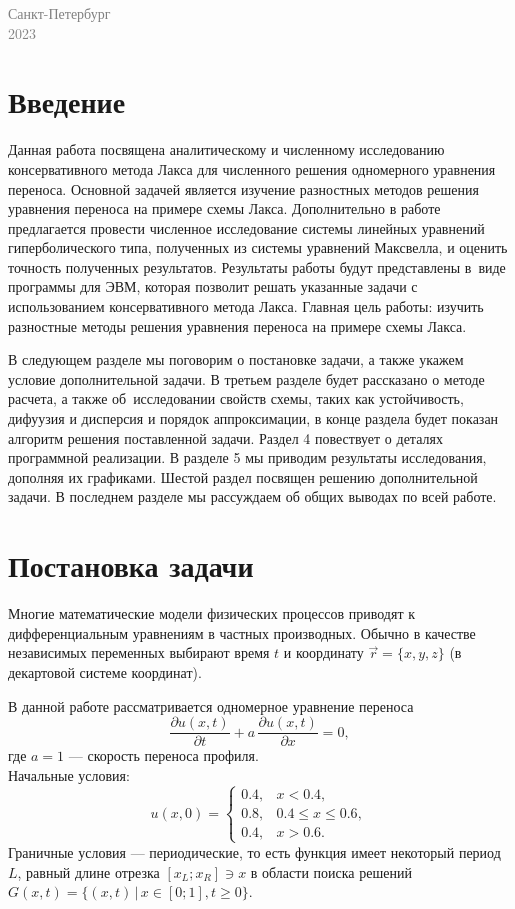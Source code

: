 \documentclass[12pt,a4paper]{article}
\begin{document}
	\vspace{3em}
	\begin{center}
		\textcolor{gray}{Санкт-Петербург}\\ \textcolor{gray}{2023}
	\end{center}
	
	\tableofcontents\newpage
	
	\section{Введение}
	Данная работа посвящена аналитическому и численному исследованию консервативного метода Лакса для численного решения одномерного уравнения переноса. Основной задачей является изучение разностных методов решения уравнения переноса на примере схемы Лакса. Дополнительно в работе предлагается провести численное исследование системы линейных уравнений гиперболического типа, полученных из системы уравнений Максвелла, и оценить точность полученных результатов. Результаты работы будут представлены в~виде программы для ЭВМ, которая позволит решать указанные задачи с использованием консервативного метода Лакса. Главная цель работы: изучить разностные методы решения уравнения переноса на примере схемы Лакса.
	
	В следующем разделе мы поговорим о постановке задачи, а также укажем условие дополнительной задачи. В третьем разделе будет рассказано о методе расчета, а также об~исследовании свойств схемы, таких как устойчивость, дифуузия и дисперсия и порядок аппроксимации, в конце раздела будет показан алгоритм решения поставленной задачи. Раздел 4 повествует о деталях программной реализации. В разделе 5 мы приводим результаты исследования, дополняя их графиками. Шестой раздел посвящен решению дополнительной задачи. В последнем разделе мы рассуждаем об общих выводах по всей работе.
	
	\section{Постановка задачи}
	Многие математические модели физических процессов приводят к дифференциальным уравнениям в частных производных. Обычно в качестве независимых переменных выбирают время $t$ и координату $\vec{r} = \{x, y, z\}$ (в декартовой системе координат).
	
	В данной работе рассматривается одномерное уравнение переноса
	\begin{equation}
		\frac{\partial u(x,t)}{\partial t} + a\,\frac{\partial u(x,t)}{\partial x} = 0,
	\end{equation}
	где $a = 1$ --- скорость переноса профиля.\\
	Начальные условия:
	\begin{equation}
		u(x, 0) = 
		\begin{cases}
			0.4, & x < 0.4,\\
			0.8, & 0.4 \leq x \leq 0.6,\\
			0.4, & x > 0.6.
		\end{cases}
	\end{equation}
	Граничные условия --- периодические, то есть функция имеет некоторый период $L$, равный длине отрезка $[x_L; x_R] \ni x$ в области поиска решений $G(x, t) = \{(x, t) \,|\, x \in [0; 1], t \geq 0\}$.
	
\end{document}
